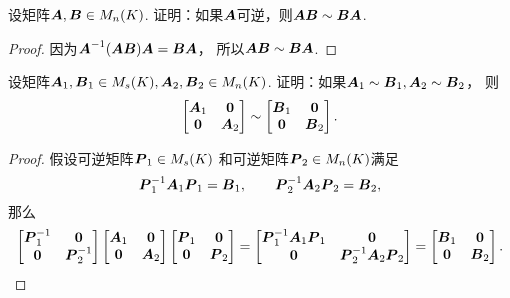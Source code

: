 \begin{example}
设矩阵\(\boldsymbol{A},\boldsymbol{B} \in M_n(K)\).
证明：如果\(\boldsymbol{A}\)可逆，则\(\boldsymbol{A}\boldsymbol{B} \sim \boldsymbol{B}\boldsymbol{A}\).
\begin{proof}
因为\(\boldsymbol{A}^{-1}(\boldsymbol{A}\boldsymbol{B})\boldsymbol{A}
= \boldsymbol{B}\boldsymbol{A}\)，
所以\(\boldsymbol{A}\boldsymbol{B} \sim \boldsymbol{B}\boldsymbol{A}\).
\end{proof}
\end{example}
\begin{example}\label{example:相似矩阵.分块对角矩阵的相似性}
设矩阵\(\boldsymbol{A}_1,\boldsymbol{B}_1 \in M_s(K),
\boldsymbol{A}_2,\boldsymbol{B}_2 \in M_n(K)\).
证明：如果\(\boldsymbol{A}_1 \sim \boldsymbol{B}_1,\boldsymbol{A}_2 \sim \boldsymbol{B}_2\)，
则\begin{equation*}
	\begin{bmatrix}
		\boldsymbol{A}_1 & \boldsymbol0 \\
		\boldsymbol0 & \boldsymbol{A}_2
	\end{bmatrix}
	\sim \begin{bmatrix}
		\boldsymbol{B}_1 & \boldsymbol0 \\
		\boldsymbol0 & \boldsymbol{B}_2
	\end{bmatrix}.
\end{equation*}
\begin{proof}
假设可逆矩阵\(\boldsymbol{P}_1 \in M_s(K)\)
和可逆矩阵\(\boldsymbol{P}_2 \in M_n(K)\)满足\begin{equation*}
	\boldsymbol{P}_1^{-1} \boldsymbol{A}_1 \boldsymbol{P}_1 = \boldsymbol{B}_1,
	\qquad
	\boldsymbol{P}_2^{-1} \boldsymbol{A}_2 \boldsymbol{P}_2 = \boldsymbol{B}_2,
\end{equation*}
那么\begin{equation*}
	\begin{bmatrix}
		\boldsymbol{P}_1^{-1} & \boldsymbol0 \\
		\boldsymbol0 & \boldsymbol{P}_2^{-1}
	\end{bmatrix}
	\begin{bmatrix}
		\boldsymbol{A}_1 & \boldsymbol0 \\
		\boldsymbol0 & \boldsymbol{A}_2
	\end{bmatrix}
	\begin{bmatrix}
		\boldsymbol{P}_1 & \boldsymbol0 \\
		\boldsymbol0 & \boldsymbol{P}_2
	\end{bmatrix}
	= \begin{bmatrix}
		\boldsymbol{P}_1^{-1} \boldsymbol{A}_1 \boldsymbol{P}_1 & \boldsymbol0 \\
		\boldsymbol0 & \boldsymbol{P}_2^{-1} \boldsymbol{A}_2 \boldsymbol{P}_2
	\end{bmatrix}
	= \begin{bmatrix}
		\boldsymbol{B}_1 & \boldsymbol0 \\
		\boldsymbol0 & \boldsymbol{B}_2
	\end{bmatrix}.
	\qedhere
\end{equation*}
\end{proof}
\end{example}
